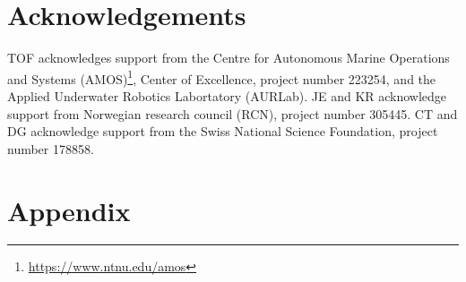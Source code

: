 \documentclass[aoas]{imsart}
\begin{document}
\section*{Acknowledgements}

TOF acknowledges support from the Centre for Autonomous Marine
Operations and Systems
(AMOS)\footnote{\url{https://www.ntnu.edu/amos}}, Center of
Excellence, project number 223254, and the Applied Underwater Robotics
Labortatory (AURLab). JE and KR acknowledge support from Norwegian
research council (RCN), project number 305445. CT and DG acknowledge
support from the Swiss National Science Foundation, project number
178858.


\footnotesize




\section*{Appendix}






\end{document}
